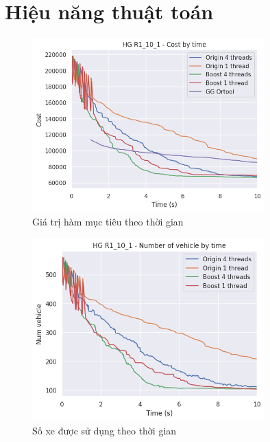 \section{Hiệu năng thuật toán}

\begin{figure}[H] %
  \centering %
  \includegraphics[width=0.8\textwidth]{figures/perf_10s.png} 
  \caption{Giá trị hàm mục tiêu theo thời gian} 
  \label{fig:pf_01}
\end{figure}

\begin{figure}[H] %
  \centering %
  \includegraphics[width=0.8\textwidth]{figures/perf_nv_10s.png} 
  \caption{Số xe được sử dụng theo thời gian}
  \label{fig:pf_02}
\end{figure}